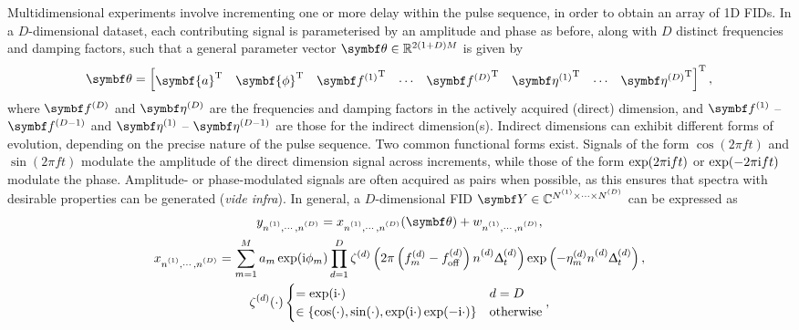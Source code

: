 Multidimensional experiments involve incrementing one or more delay within the
pulse sequence, in order to obtain an array of \ac{1D} \acp{FID}. In a
$D$-dimensional dataset, each contributing signal is parameterised by an
amplitude and phase as before, along with $D$ distinct frequencies and damping
factors, such that a general parameter vector  $\bth \in \mathbb{R}^{2(1+D)M}$
is given by
\begin{equation}
    \bth =
    \begin{bmatrix}
    \symbf{a}\T &
    \symbf{\phi}\T &
    {\bdfone}\T &
    \cdots &
    {\bdfD}\T &
    {\bdetaone}\T &
    \cdots &
    {\bdetaD}\T
    \end{bmatrix}\T,
    \label{eq:theta}
\end{equation}
where $\bdfD$ and $\bdetaD$ are the frequencies and damping factors in the
actively acquired (direct) dimension, and $\bdfone$ -- $\bdfDminusone$ and
$\bdetaone$ -- $\bdetaDminusone$ are those for the indirect dimension(s).
Indirect dimensions can exhibit different forms of evolution, depending on
the precise nature of the pulse sequence. Two common functional
forms exist\cite[\S 4.3.4]{Cavanagh2007}. Signals of the form $\cos(2 \pi
f t)$ and $\sin(2 \pi f t)$ modulate the amplitude of the direct
dimension signal across increments, while those of the form $\exp(2 \pi \mathrm{i} f
t)$ or $\exp(-2 \pi \mathrm{i} f t)$ modulate the phase.  Amplitude- or
phase-modulated signals are often acquired as pairs when possible, as this
ensures that spectra with desirable properties can be generated (\emph{vide
infra}). In general, a $D$-dimensional \ac{FID} $\bY \in \mathbb{C}^{\None
\times \cdots \times \ND}$ can be expressed as
\begin{subequations}
    \begin{gather}
        \ynonenD = \xnonenD(\bth) + \wnonenD,\\
        \xnonenD
            = \sumM \amexpphim \prodD
            \zeta^{(d)}\left(2 \pi \left(f^{(d)}_m  - \foffd\right) \nd \Dtd\right)
            \exp\left(-\eta^{(d)}_m \nd \Dtd\right),\\
        \zeta^{(d)}(\cdot)
        \begin{cases}
            = \exp(\iu\cdot) & d = D \\
            \in \left\lbrace \cos(\cdot), \sin(\cdot), \exp(\iu\cdot) \exp(-\iu\cdot)\right\rbrace & \text{otherwise}
        \end{cases},
    \end{gather}
    \label{eq:general-fid}%
\end{subequations}%

